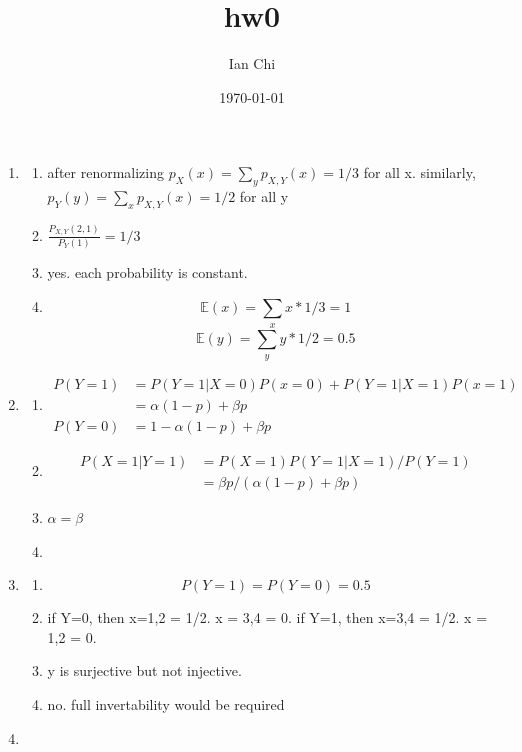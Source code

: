 \documentclass{article}
\title{hw0}
\author{Ian Chi}
\date{\today}
\begin{document}
\maketitle

\begin{enumerate}
    \item \begin{enumerate}
        \item after renormalizing \(p_X(x) = \sum_{y}^{}p_{X,Y}(x)=1/3\) for all x.
        similarly, \(p_Y(y) = \sum_{x}^{}p_{X,Y}(x)=1/2\) for all y
        \item \(\frac{P_{X,Y}(2,1)}{P_Y(1)}=1/3\)
        \item yes. each probability is constant.
        \item \begin{equation}
            \mathbb E(x) = \sum_{x}^{}x*1/3 = 1
        \end{equation}
        \begin{equation}
            \mathbb E(y) = \sum_{y}^{}y*1/2 = 0.5
        \end{equation}
    \end{enumerate}
    \item \begin{enumerate}
        \item \begin{equation}
            \begin{split}
                P(Y=1) &= P(Y=1|X=0)P(x=0) +P(Y=1|X=1)P(x=1) \\
                &=\alpha(1-p) + \beta p\\
                P(Y=0)&= 1-\alpha(1-p) + \beta p
            \end{split}
        \end{equation}
        \item \begin{equation}\begin{split}
                P(X=1|Y=1) &= P(X=1)P(Y=1|X=1)/P(Y=1) \\
                &= \beta p/(\alpha(1-p) + \beta p)
        \end{split}
        \end{equation}
        \item \(\alpha = \beta\)
        \item 
    \end{enumerate}
    \item \begin{enumerate}
        \item \begin{equation}
            P(Y=1) = P(Y=0) = 0.5
        \end{equation}
        \item if Y=0, then x=1,2 = 1/2. x = 3,4 = 0.
        if Y=1, then x=3,4 = 1/2. x = 1,2 = 0.
        \item y is surjective but not injective. 
        \item no. full invertability would be required
        \end{enumerate}
    \item 
\end{enumerate}
\end{document}
